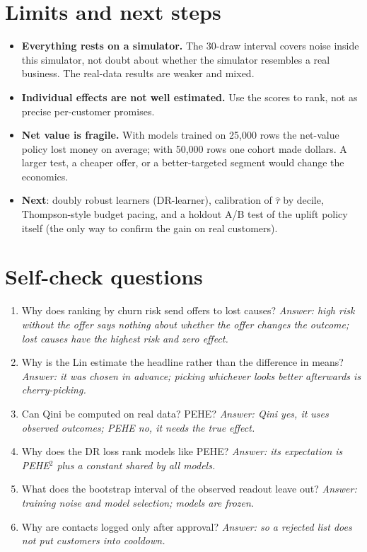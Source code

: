 \documentclass[11pt]{article}
\begin{document}
\section{Limits and next steps}
\begin{itemize}
\item \textbf{Everything rests on a simulator.} The 30-draw interval covers noise inside this simulator, not doubt about whether the simulator resembles a real business. The real-data results are weaker and mixed.
\item \textbf{Individual effects are not well estimated.} Use the scores to rank, not as precise per-customer promises.
\item \textbf{Net value is fragile.} With models trained on 25{,}000 rows the net-value policy lost money on average; with 50{,}000 rows one cohort made \RtrueNet{} dollars. A larger test, a cheaper offer, or a better-targeted segment would change the economics.
\item \textbf{Next}: doubly robust learners (DR-learner), calibration of $\hat\tau$ by decile, Thompson-style budget pacing, and a holdout A/B test of the uplift policy itself (the only way to confirm the gain on real customers).
\end{itemize}

\section{Self-check questions}
\begin{enumerate}
\item Why does ranking by churn risk send offers to lost causes? \emph{Answer: high risk without the offer says nothing about whether the offer changes the outcome; lost causes have the highest risk and zero effect.}
\item Why is the Lin estimate the headline rather than the difference in means? \emph{Answer: it was chosen in advance; picking whichever looks better afterwards is cherry-picking.}
\item Can Qini be computed on real data? PEHE? \emph{Answer: Qini yes, it uses observed outcomes; PEHE no, it needs the true effect.}
\item Why does the DR loss rank models like PEHE? \emph{Answer: its expectation is PEHE$^2$ plus a constant shared by all models.}
\item What does the bootstrap interval of the observed readout leave out? \emph{Answer: training noise and model selection; models are frozen.}
\item Why are contacts logged only after approval? \emph{Answer: so a rejected list does not put customers into cooldown.}
\end{enumerate}
\end{document}
